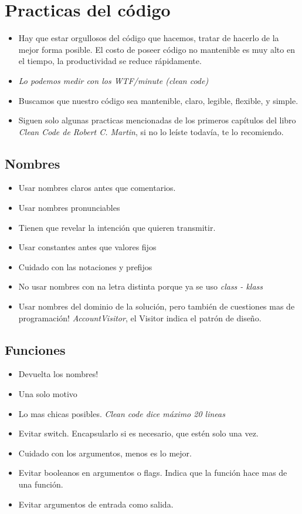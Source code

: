 \section{Practicas del código}

\begin{itemize}
\item Hay que estar orgullosos del código que hacemos, tratar de hacerlo de la mejor forma posible. El costo de poseer código no mantenible es muy alto en el tiempo, la productividad se reduce rápidamente.
\item \textit{Lo podemos medir con los WTF/minute (clean code)}
\item Buscamos que nuestro código sea mantenible, claro, legible, flexible, y simple.
\item Siguen solo algunas practicas mencionadas de los primeros capítulos del libro \textit{Clean Code de Robert C. Martin}, si no lo leíste todavía, te lo recomiendo.
\end{itemize}


\subsection*{Nombres}
\begin{itemize}
\item Usar nombres claros antes que comentarios.
\item Usar nombres pronunciables
\item Tienen que revelar la intención que quieren transmitir.
\item Usar constantes antes que valores fijos
\item Cuidado con las notaciones y prefijos
\item No usar nombres con na letra distinta porque ya se uso \textit{class - klass}
\item Usar nombres del dominio de la solución, pero también de cuestiones mas de programación! \textit{AccountVisitor}, el Visitor indica el patrón de diseño.
\end{itemize}

\subsection*{Funciones}
\begin{itemize}
\item Devuelta los nombres!
\item Una solo motivo
\item Lo mas chicas posibles. \textit{Clean code dice máximo 20 lineas}
\item Evitar switch. Encapsularlo si es necesario, que estén solo una vez.
\item Cuidado con los argumentos, menos es lo mejor.
\item Evitar booleanos en argumentos o flags. Indica que la función hace mas de una función.
\item Evitar argumentos de entrada como salida.
\end{itemize}

